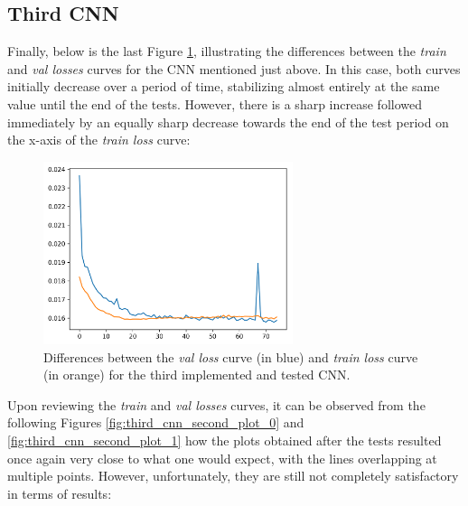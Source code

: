 \documentclass[12pt,italian]{report}
\begin{document}
\subsection{Third CNN}
\label{subsec:third_cnn_results}

Finally, below is the last Figure \ref{fig:third_cnn_first_plot}, illustrating the differences between the \textit{train} and \textit{val losses} curves for the CNN mentioned just above. In this case, both curves initially decrease over a period of time, stabilizing almost entirely at the same value until the end of the tests. However, there is a sharp increase followed immediately by an equally sharp decrease towards the end of the test period on the x-axis of the \textit{train loss} curve:

\begin{figure}[H]
    \centering
    \includegraphics[width=0.65\textwidth]{images/third_cnn_first_plot.png}
    \captionsetup{justification=centering}
    \caption{Differences between the \textit{val loss} curve (in blue) and \textit{train loss} curve (in orange) for the third implemented and tested CNN.}
    \label{fig:third_cnn_first_plot}
\end{figure}

Upon reviewing the \textit{train} and \textit{val losses} curves, it can be observed from the following Figures \ref{fig:third_cnn_second_plot_0} and \ref{fig:third_cnn_second_plot_1} how the plots obtained after the tests resulted once again very close to what one would expect, with the lines overlapping at multiple points. However, unfortunately, they are still not completely satisfactory in terms of results:
\end{document}
